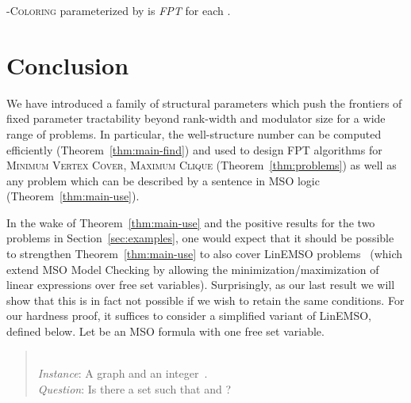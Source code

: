\documentclass{llncs}
\begin{document}
\begin{corollary}
\label{cor:coloring}
\textsc{-Coloring} parameterized by  is \emph{FPT} for each .
\end{corollary}


\section{Conclusion}
\label{sec:hardness}

We have introduced a family of structural parameters which push the frontiers of fixed parameter tractability beyond rank-width and modulator size for a wide range of problems. In particular, the well-structure number can be computed efficiently (Theorem~\ref{thm:main-find}) and used to design FPT algorithms for \textsc{Minimum Vertex Cover}, \textsc{Maximum Clique} (Theorem~\ref{thm:problems}) as well as any problem which can be described by a sentence in MSO logic (Theorem~\ref{thm:main-use}).

In the wake of Theorem~\ref{thm:main-use} and the positive results for
the two problems in Section~\ref{sec:examples}, one would expect that
it should be possible to strengthen Theorem~\ref{thm:main-use} to also
cover LinEMSO
problems~\cite{CourcelleMakowskyRotics00,GanianHlineny10} (which
extend MSO Model Checking by allowing the minimization/maximization of
linear expressions over free set variables). Surprisingly, as our last
result we will show that this is in fact not possible if we wish to retain
the same conditions. For our hardness proof, it suffices to consider
a simplified variant of LinEMSO, defined below. Let  be an
MSO formula with one free set variable.
\begin{quote}
  \\
  \nopagebreak \emph{Instance}: A graph  and an integer~. \\ \nopagebreak \nopagebreak \emph{Question}: Is there a set
   such that  and ?
\end{quote}

\end{document}
